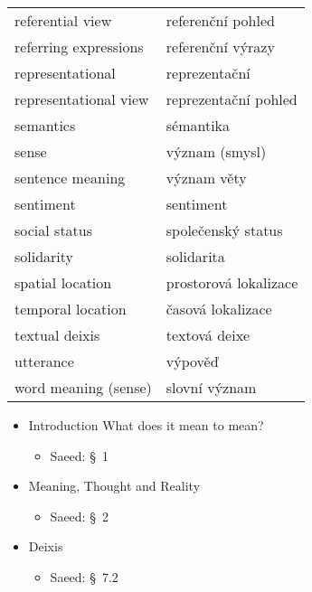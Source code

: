 \documentclass[a4paper,landscape,headrule,footrule,xetex,25pt]{foils}
\begin{document}
\begin{flushleft}
\begin{longtable}{ll}
referential view & referenční pohled \\
referring expressions & referenční výrazy \\
representational & reprezentační \\
representational view & reprezentační pohled \\
semantics & sémantika \\
sense & význam (smysl) \\
sentence meaning & význam věty \\
sentiment & sentiment \\
social status & společenský status \\
solidarity & solidarita \\
spatial location & prostorová lokalizace \\
temporal location & časová lokalizace \\
textual deixis & textová deixe \\
utterance & výpověď \\
word meaning (sense) & slovní význam \\
\end{longtable}
\end{flushleft}


\begin{itemize}
\item Introduction What does it mean to mean?
  \begin{itemize}
  \item Saeed: \S~1
  \end{itemize}

\item Meaning, Thought and Reality
  \begin{itemize}
  \item Saeed: \S~2
  \end{itemize}
  
\item Deixis
  \begin{itemize}
  \item Saeed: \S~7.2
  \end{itemize}
\end{itemize}
\end{document}
